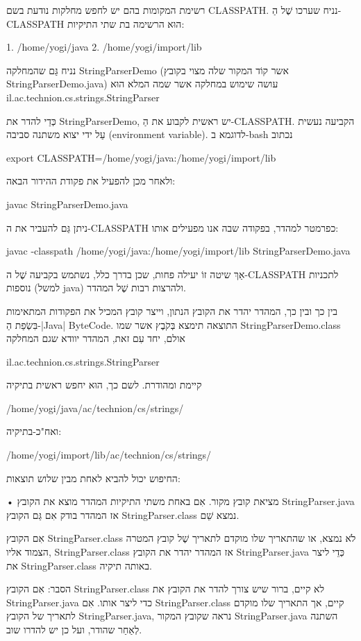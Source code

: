 רשימת המקומות בהם יש לחפש מחלקות נודעת בשם CLASSPATH. נניח שערכו שֶׁל
הַ-CLASSPATH הוּא הרשימה בת שתי התיקיות:

1. /home/yogi/java
2. /home/yogi/import/lib

נניח גַּם שהמחלקה StringParserDemo (אשר קוֹד המקור שלה מצוי בקובץ
StringParserDemo.java) עושה שימוש במחלקה אשר שמה המלא הוּא
il.ac.technion.cs.strings.StringParser

כְּדֵי להדר את StringParserDemo, יש ראשית לקבוע את הַ-CLASSPATH. הקביעה
נעשית עַל ידי יצוא משתנה סביבה (environment variable). לדוגמא ב-bash נכתוב

export CLASSPATH=/home/yogi/java:/home/yogi/import/lib

ולאחר מכן להפעיל את פקודת ההידור הבאה:

javac StringParserDemo.java

ניתן גַּם להעביר את ה-CLASSPATH כפרמטר למהדר, בפקודה שבה אנו מפעילים אותו:

javac -classpath /home/yogi/java:/home/yogi/import/lib StringParserDemo.java

אַךְ שיטה זוֹ יעילה פחות, שכן בדרך כלל, נשתמש בקביעה שֶׁל ה-CLASSPATH לתכניות
נוספות (למשל java) ולהרצות רבות שֶׁל המהדר.

בין כך ובין כך, המהדר יהדר את הקובץ הנתון, וייצר קובץ המכיל את
הפקודות המתאימות בִּשְׂפַת הַ-|Java| ByteCode. התוצאה תימצא בְּקֹבֶץ אשר שמו
StringParserDemo.class אולם, יחד עִם זאת, המהדר יוודא שגם המחלקה

 il.ac.technion.cs.strings.StringParser

קיימת ומהודרת. לשם כך, הוּא יחפש ראשית בתיקיה

/home/yogi/java/ac/technion/cs/strings/

ואח"כ-בתיקיה:

/home/yogi/import/lib/ac/technion/cs/strings/

החיפוש יכול להביא לאחת מבין שלוש תוצאות:


• מציאת קובץ מקור. אִם באחת משתי התיקיות המהדר מוצא את הקובץ
StringParser.java אז המהדר בודק אִם גַּם הקובץ StringParser.class נמצא
שֵׁם.

אִם הקובץ StringParser.class לֹא נמצא, או שהתאריך שלו מוקדם לתאריך שֶׁל קובץ
המטרה הצמוד אליו, StringParser.class אז המהדר יהדר את הקובץ
StringParser.java כְּדֵי ליצר את StringParser.class באותה תיקיה.

הסבר: אִם הקובץ StringParser.class לא קיים, ברור שיש צורך להדר את הקובץ את
StringParser.java כדי ליצר אותו. אִם StringParser.class קיים, אך התאריך שלו
מוקדם לתאריך של הקובץ StringParser.java, נראה שקובץ המקור StringParser.java
השתנה לְאַחַר שהודר, ועל כן יש להדרו שוב.

